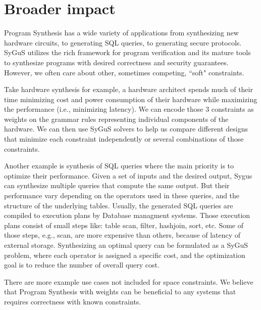 \section{Broader impact}
\label{sec:impact}
Program Synthesis has a wide variety of applications from synthesizing new hardware circuits, to generating SQL queries, to generating secure protocols.
%
SyGuS utilizes the rich framework for program verification and its mature tools to synthesize programs with desired correctness and security guarantees.
%
However, we often care about other, sometimes competing, ``soft" constraints.
%

Take hardware synthesis for example, a hardware architect spends much of their time minimizing cost and power consumption of their hardware while maximizing the performance (i.e., minimizing latency).
%
We can encode those 3 constraints as weights on the grammar rules representing individual components of the hardware.
%
We can then use SyGuS solvers to help us compare different designs that minimize each constraint independently or several combinations of those constraints.
%

Another example is synthesis of SQL queries where the main priority is to optimize their performance.
%
Given a set of inputs and the desired output, Sygus can synthesize multiple queries that compute the same output.  
%
But their performance vary depending on the operators used in these queries, and the structure of the underlying tables. 
%
Usually, the generated SQL queries are compiled to execution plans by Database managment systems.
%
Those execution plans consist of small steps like: table scan, filter, hashjoin, sort, etc.
%
Some of those steps, e.g., scan, are more expensive than others, because of latency of external storage.
%
Synthesizing an optimal query can be formulated as a SyGuS problem, where each operator is assigned a specific cost, and the optimization goal is to reduce the number of overall query cost.
%

There are more example use cases not included for space constraints. We believe that Program Synthesis with weights can be beneficial to any systems that requires correctness with known constraints.
